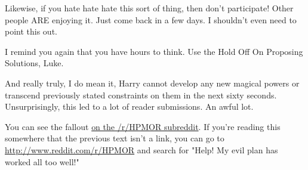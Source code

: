 \SmallVSpace
\noindent
Likewise, if you hate hate hate this sort of thing, then don't
participate!
Other people ARE enjoying it. Just come back in a few days.
I shouldn't even need to point this out.

\SmallVSpace
\noindent
I remind you again that you have hours to think.
Use the Hold Off On Proposing Solutions, Luke.

\SmallVSpace
\noindent
And really truly, I do mean it,
Harry cannot develop any new magical powers
or transcend previously stated constraints on them
in the next sixty seconds.
\sbreak
Unsurprisingly, this led to a lot of reader submissions. An awful lot.

You can see the
fallout \href{http://www.reddit.com/r/HPMOR/comments/2xnyi0/113_help_my_evil_plan_has_worked_all_too_well/}{on the /r/HPMOR subreddit}. 
If you're reading this somewhere that the previous text isn't a link, you 
can go to \url{http://www.reddit.com/r/HPMOR} and search for "Help! My evil plan has worked all too well!"
